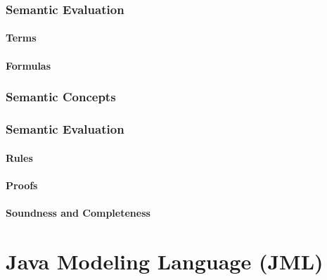 \documentclass[a4paper, 11pt, accentcolor = tud3b]{tudreport}
\begin{document}
            \subsection{Semantic Evaluation} %

                \subsubsection{Terms} %

                \subsubsection{Formulas} %

            \subsection{Semantic Concepts} %

            \subsection{Semantic Evaluation} %

                \subsubsection{Rules} %

                \subsubsection{Proofs} %

                \subsubsection{Soundness and Completeness} %

    \chapter{Java Modeling Language (JML)} %
\end{document}
